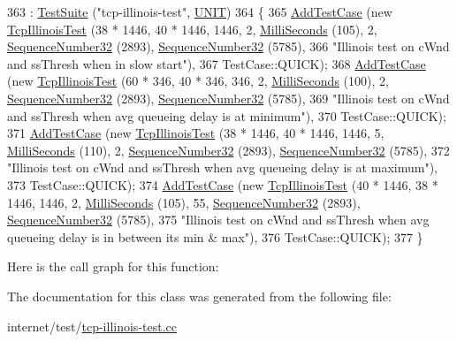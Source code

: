 \begin{DoxyCode}
363                           : \hyperlink{classns3_1_1TestSuite_a904b0c40583b744d30908aeb94636d1a}{TestSuite} (\textcolor{stringliteral}{"tcp-illinois-test"}, \hyperlink{classns3_1_1TestSuite_a1ebfcab34ec8161e085e8e3a1855eae0a3885375a3787abf60431f8454b3cadbd}{UNIT})
364   \{
365     \hyperlink{classns3_1_1TestCase_a3718088e3eefd5d6454569d2e0ddd835}{AddTestCase} (\textcolor{keyword}{new} \hyperlink{classTcpIllinoisTest}{TcpIllinoisTest} (38 * 1446, 40 * 1446, 1446, 2, 
      \hyperlink{group__timecivil_gaf26127cf4571146b83a92ee18679c7a9}{MilliSeconds} (105), 2, \hyperlink{classns3_1_1SequenceNumber}{SequenceNumber32} (2893), 
      \hyperlink{classns3_1_1SequenceNumber}{SequenceNumber32} (5785),
366                                       \textcolor{stringliteral}{"Illinois test on cWnd and ssThresh when in slow start"}),
367                  TestCase::QUICK);
368     \hyperlink{classns3_1_1TestCase_a3718088e3eefd5d6454569d2e0ddd835}{AddTestCase} (\textcolor{keyword}{new} \hyperlink{classTcpIllinoisTest}{TcpIllinoisTest} (60 * 346, 40 * 346, 346, 2, 
      \hyperlink{group__timecivil_gaf26127cf4571146b83a92ee18679c7a9}{MilliSeconds} (100), 2, \hyperlink{classns3_1_1SequenceNumber}{SequenceNumber32} (2893), 
      \hyperlink{classns3_1_1SequenceNumber}{SequenceNumber32} (5785),
369                                       \textcolor{stringliteral}{"Illinois test on cWnd and ssThresh when avg queueing delay is at
       minimum"}),
370                  TestCase::QUICK);
371     \hyperlink{classns3_1_1TestCase_a3718088e3eefd5d6454569d2e0ddd835}{AddTestCase} (\textcolor{keyword}{new} \hyperlink{classTcpIllinoisTest}{TcpIllinoisTest} (38 * 1446, 40 * 1446, 1446, 5, 
      \hyperlink{group__timecivil_gaf26127cf4571146b83a92ee18679c7a9}{MilliSeconds} (110), 2, \hyperlink{classns3_1_1SequenceNumber}{SequenceNumber32} (2893), 
      \hyperlink{classns3_1_1SequenceNumber}{SequenceNumber32} (5785),
372                                       \textcolor{stringliteral}{"Illinois test on cWnd and ssThresh when avg queueing delay is at
       maximum"}),
373                  TestCase::QUICK);
374     \hyperlink{classns3_1_1TestCase_a3718088e3eefd5d6454569d2e0ddd835}{AddTestCase} (\textcolor{keyword}{new} \hyperlink{classTcpIllinoisTest}{TcpIllinoisTest} (40 * 1446, 38 * 1446, 1446, 2, 
      \hyperlink{group__timecivil_gaf26127cf4571146b83a92ee18679c7a9}{MilliSeconds} (105), 55, \hyperlink{classns3_1_1SequenceNumber}{SequenceNumber32} (2893), 
      \hyperlink{classns3_1_1SequenceNumber}{SequenceNumber32} (5785),
375                                       \textcolor{stringliteral}{"Illinois test on cWnd and ssThresh when avg queueing delay is in
       between its min & max"}),
376                  TestCase::QUICK);
377   \}
\end{DoxyCode}


Here is the call graph for this function\+:




The documentation for this class was generated from the following file\+:\begin{DoxyCompactItemize}
\item 
internet/test/\hyperlink{tcp-illinois-test_8cc}{tcp-\/illinois-\/test.\+cc}\end{DoxyCompactItemize}
